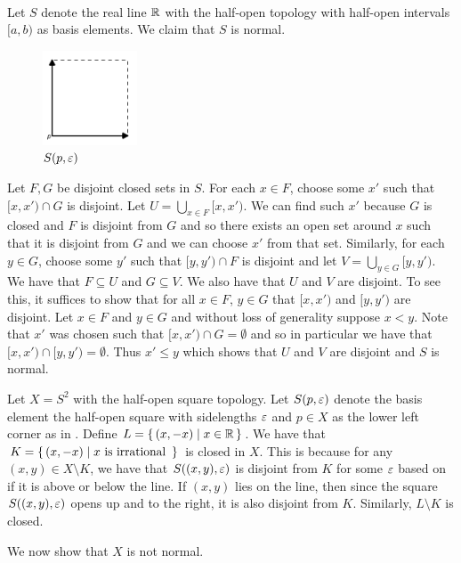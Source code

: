 \documentclass[letterpaper, 11pt, oneside]{book}
\begin{document}
\begin{ex}\

  Let $S$ denote the real line $\mathbb{R}$ with the half-open topology with half-open intervals $[a, b)$ as basis elements.
  We claim that $S$ is normal.
  \begin{figure}[h]
    \centering
    \includegraphics[width=0.25\textwidth]{figs/Sorgengrey_Half_Open.png}
    \caption{$S(p, \varepsilon)$}\label{fig:sorgenfrey_half_open}
  \end{figure}
  Let $F, G$ be disjoint closed sets in $S$.
  For each $x \in F$, choose some $x'$ such that $[x, x') \cap G$ is disjoint.
  Let $U = \bigcup_{x \in F}[x, x')$.
  We can find such $x'$ because $G$ is closed and $F$ is disjoint from $G$ and so there exists an open set around $x$ such that it is disjoint from $G$ and we can choose $x'$ from that set.
  Similarly, for each $y \in G$, choose some $y'$ such that $[y, y') \cap F$ is disjoint and let $V = \bigcup_{y \in G}[y, y')$.
  We have that $F \subseteq U$ and $G \subseteq V$.
  We also have that $U$ and $V$ are disjoint.
  To see this, it suffices to show that for all $x \in F$, $y \in G$ that $[x, x')$ and $[y, y')$ are disjoint.
  Let $x \in F$ and $y \in G$ and without loss of generality suppose $x < y$.
  Note that $x'$ was chosen such that $[x, x') \cap G = \emptyset$ and so in particular we have that $[x, x') \cap [y, y') = \emptyset$.
  Thus $x' \leq y$ which shows that $U$ and $V$ are disjoint and $S$ is normal.

  Let $X = S^{2}$ with the half-open square topology.
  Let $S(p, \varepsilon)$ denote the basis element the half-open square with sidelengths $\varepsilon$ and $p \in X$ as the lower left corner as in .
  Define $L = \set{(x, -x) | x \in \mathbb{R}}$.
  We have that $K = \set{(x, -x) | x \text{ is irrational }}$ is closed in $X$.
  This is because for any $(x, y) \in X \setminus K$, we have that $S((x, y), \varepsilon)$ is disjoint from $K$ for some $\varepsilon$ based on if it is above or below the line.
  If $(x, y)$ lies on the line, then since the square $S((x, y), \varepsilon)$ opens up and to the right, it is also disjoint from $K$.
  Similarly, $L \setminus K$ is closed.

  We now show that $X$ is not normal.
\end{ex}
\end{document}
